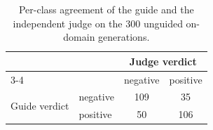 \begin{table}[htbp]
  \centering
  \small
  \begin{tabular}{llcc}
    \toprule
     & & \multicolumn{2}{c}{Judge verdict} \\
    \cmidrule(lr){3-4}
     & & negative & positive \\
    \midrule
    \multirow{2}{*}{Guide verdict} & negative & 109 & 35 \\
     & positive & 50 & 106 \\
    \bottomrule
  \end{tabular}
  \caption[Per-class agreement of the guide and the independent judge.]{Per-class agreement of the guide and the independent judge on the 300 unguided on-domain generations.}
  \label{tab:confusion}
\end{table}
